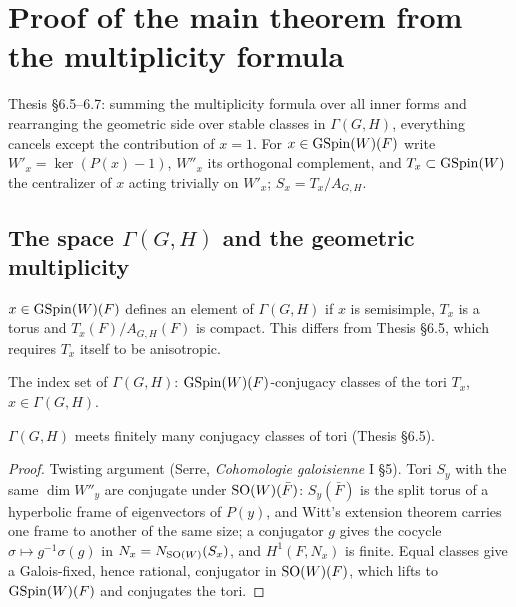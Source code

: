 \chapter{Proof of the main theorem from the multiplicity formula}
\label{chap:proofmain}
Thesis \S6.5--6.7: summing the multiplicity formula over all inner forms and rearranging the geometric
side over stable classes in $\Gamma(G,H)$, everything cancels except the contribution of $x=1$.
For $x\in\mathrm{GSpin}(W)(F)$ write $W'_x=\ker(P(x)-1)$, $W''_x$ its orthogonal complement, and
$T_x\subset\mathrm{GSpin}(W)$ the centralizer of $x$ acting trivially on $W'_x$; $S_x=T_x/A_{G,H}$.

\section{\texorpdfstring{The space $\Gamma(G,H)$ and the geometric multiplicity}{The space Gamma(G,H) and the geometric multiplicity}}
\begin{definition}
\label{IsGammaElt}
\leanok
{}
$x\in\mathrm{GSpin}(W)(F)$ defines an element of $\Gamma(G,H)$ if $x$ is semisimple, $T_x$ is a torus and
$T_x(F)/A_{G,H}(F)$ is compact. This differs from Thesis \S6.5, which requires $T_x$ itself to be anisotropic.
\end{definition}

\begin{definition}
\label{GammaClass}
\leanok
{}
The index set of $\Gamma(G,H)$: $\mathrm{GSpin}(W)(F)$-conjugacy classes of the tori $T_x$, $x\in\Gamma(G,H)$.
\end{definition}

\begin{lemma}
\label{finite_gammaClass}
\leanok
{}
$\Gamma(G,H)$ meets finitely many conjugacy classes of tori (Thesis \S6.5).
\end{lemma}
\begin{proof}
\leanok
{}
Twisting argument (Serre, \emph{Cohomologie galoisienne} I \S5). Tori $S_y$ with the same $\dim W''_y$ are conjugate
under $\mathrm{SO}(W)(\bar F)$: $S_y(\bar F)$ is the split torus of a hyperbolic frame of eigenvectors of $P(y)$, and
Witt's extension theorem carries one frame to another of the same size; a conjugator $g$ gives the
cocycle $\sigma\mapsto g^{-1}\sigma(g)$ in $N_x=N_{\mathrm{SO}(W)}(S_x)$, and $H^1(F,N_x)$ is finite. Equal classes give a
Galois-fixed, hence rational, conjugator in $\mathrm{SO}(W)(F)$, which lifts to $\mathrm{GSpin}(W)(F)$ and conjugates the tori.
\end{proof}

